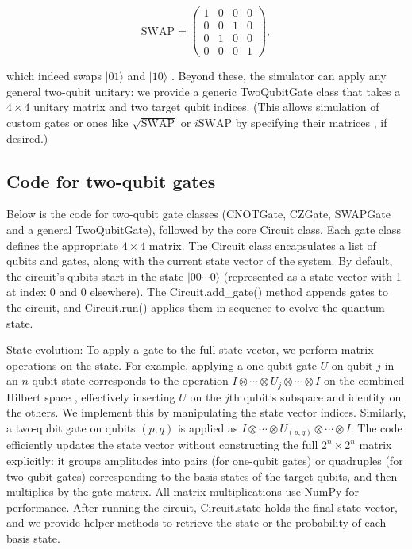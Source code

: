 \documentclass[%
oneside,                 %
final,                   %
10pt]{article}
\begin{document}
\[
\text{SWAP} = \begin{pmatrix} 1 & 0 & 0 & 0\\ 0 & 0 & 1 & 0\\ 0 & 1 & 0 & 0\\ 0 & 0 & 0 & 1 \end{pmatrix},
\]

which indeed swaps $|01\rangle$ and $|10\rangle$ . Beyond these, the
simulator can apply any general two-qubit unitary: we provide a
generic TwoQubitGate class that takes a $4\times4$ unitary matrix and
two target qubit indices. (This allows simulation of custom gates or
ones like $\sqrt{\text{SWAP}}$ or $i\text{SWAP}$ by specifying their
matrices , if desired.)

\subsection{Code for two-qubit gates}

Below is the code for two-qubit gate classes (CNOTGate, CZGate,
SWAPGate and a general TwoQubitGate), followed by the core Circuit
class. Each gate class defines the appropriate $4\times4$ matrix. The
Circuit class encapsulates a list of qubits and gates, along with the
current state vector of the system. By default, the circuit’s qubits
start in the state $|00\cdots0\rangle$ (represented as a state vector
with 1 at index 0 and 0 elsewhere). The Circuit.add_gate() method
appends gates to the circuit, and Circuit.run() applies them in
sequence to evolve the quantum state.

State evolution: To apply a gate to the full state vector, we perform
matrix operations on the state. For example, applying a one-qubit gate
$U$ on qubit $j$ in an $n$-qubit state corresponds to the operation $I
\otimes \cdots \otimes U_j \otimes \cdots \otimes I$ on the combined
Hilbert space , effectively inserting $U$ on the $j$th qubit’s
subspace and identity on the others. We implement this by manipulating
the state vector indices. Similarly, a two-qubit gate on qubits
$(p,q)$ is applied as $I \otimes \cdots \otimes U_{(p,q)} \otimes
\cdots \otimes I$. The code efficiently updates the state vector
without constructing the full $2^n \times 2^n$ matrix explicitly: it
groups amplitudes into pairs (for one-qubit gates) or quadruples (for
two-qubit gates) corresponding to the basis states of the target
qubits, and then multiplies by the gate matrix. All matrix
multiplications use NumPy for performance. After running the circuit,
Circuit.state holds the final state vector, and we provide helper
methods to retrieve the state or the probability of each basis state.
\end{document}
